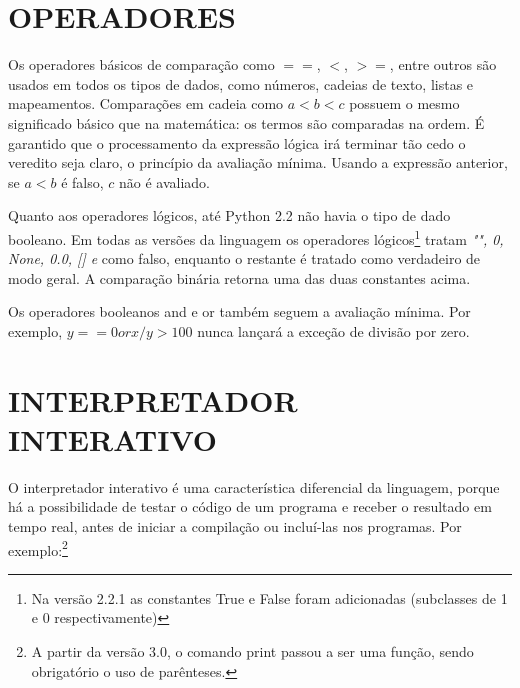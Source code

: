 \section{OPERADORES}
Os operadores básicos de comparação como $==$, $<$, $>=$, entre outros são usados em todos os tipos de dados, como números, cadeias de texto, listas e mapeamentos.
Comparações em cadeia como $a < b < c$ possuem o mesmo significado básico que na matemática: os termos são comparadas na ordem.
É garantido que o processamento da expressão lógica irá terminar tão cedo o veredito seja claro, o princípio da avaliação mínima.
Usando a expressão anterior, se $a < b$ é falso, $c$ não é avaliado.
\par Quanto aos operadores lógicos, até Python 2.2 não havia o tipo de dado booleano.
Em todas as versões da linguagem os operadores lógicos\footnote{
    Na versão 2.2.1 as constantes True e False foram adicionadas (subclasses de 1 e 0 respectivamente)
} tratam \textit{"", 0, None, 0.0, [] e {}} como falso, enquanto o restante é tratado como verdadeiro de modo geral.
A comparação binária retorna uma das duas constantes acima.
\par Os operadores booleanos and e or também seguem a avaliação mínima. Por exemplo, $y == 0 or x/y > 100$ nunca lançará a exceção de divisão por zero.

\section{INTERPRETADOR INTERATIVO}
O interpretador interativo é uma característica diferencial da linguagem, porque há a possibilidade de testar o código de um programa e receber o resultado em tempo real, antes de iniciar a compilação ou incluí-las nos programas. 
Por exemplo:\footnote{
    A partir da versão 3.0, o comando print passou a ser uma função, sendo obrigatório o uso de parênteses.
}\\



